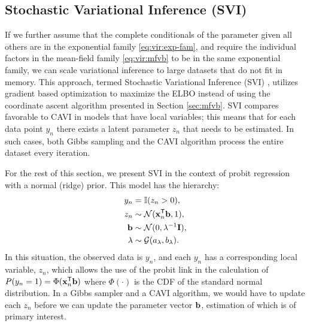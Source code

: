 \documentclass[]{article}
\newcommand{\Tra}{^{\sf T}} %
\newcommand{\Inv}{^{-1}} %
\def\b{{\bf b}}
\def\I{{\bf I}}
\def\x{{\bf x}}
\begin{document}
\subsection{Stochastic Variational Inference (SVI)}

If we further assume that the complete conditionals of the parameter given all
others are in the exponential family \eqref{eq:vir:exp-fam}, and require the
individual factors in the mean-field family \eqref{eq:vir:mfvb} to be in the
same exponential family, we can scale variational inference to large datasets
that do not fit in memory. This approach, termed Stochastic Variational
Inference (SVI) \citep{hoffman2013svi}, utilizes gradient based optimization to
maximize the ELBO instead of using the coordinate ascent algorithm presented in
Section \ref{sec:mfvb}. SVI compares favorable to CAVI in models that have local
variables; this means that for each data point $y_n$ there exists a latent
parameter $z_n$ that needs to be estimated. In such cases, both Gibbs sampling
and the CAVI algorithm process the entire dataset every iteration. 

For the rest of this section, we present SVI in the context of probit regression
with a normal (ridge) prior. This model has the hierarchy:
%
\begin{align}
\label{eq:probit_ridge}
\begin{split}
y_n & = \mathbb{I}(z_n > 0), \\
z_n & \sim \mathcal{N}(\x_n\Tra \b, 1), \\
\b & \sim \mathcal{N}(0, \lambda\Inv \I), \\
\lambda & \sim  \mathcal{G}(a_{\lambda}, b_{\lambda}).
\end{split}
\end{align}
%
In this situation, the observed data is $y_n$, and each $y_n$ has a
corresponding local variable, $z_n$, which allows the use of the probit link in
the calculation of $P(y_n = 1) = \Phi(\x_n\Tra \b)$ where $\Phi(\cdot)$ is the
CDF of the standard normal distribution. In a Gibbs sampler and a CAVI
algorithm, we would have to update each $z_n$ before we can update the parameter
vector $\b$, estimation of which is of primary interest. 
\end{document}
